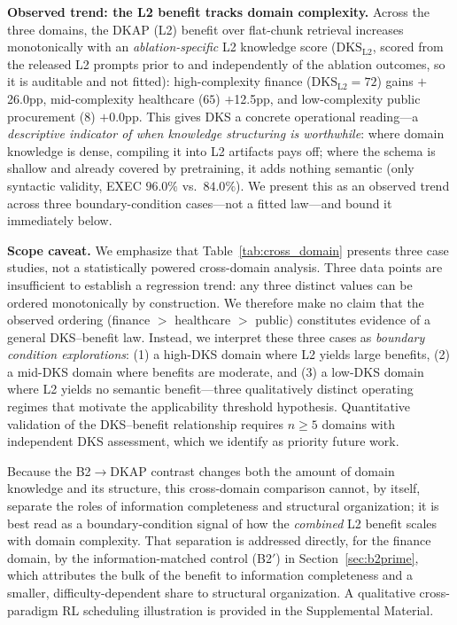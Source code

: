 \documentclass[fleqn,10pt,lineno]{wlpeerj}
\begin{document}
\textbf{Observed trend: the L2 benefit tracks domain complexity.} Across the three domains, the DKAP (L2) benefit over flat-chunk retrieval increases monotonically with an \textit{ablation-specific} L2 knowledge score ($\mathrm{DKS}_{\mathrm{L2}}$, scored from the released L2 prompts prior to and independently of the ablation outcomes, so it is auditable and not fitted): high-complexity finance ($\mathrm{DKS}_{\mathrm{L2}}{=}72$) gains $+$26.0pp, mid-complexity healthcare ($65$) $+$12.5pp, and low-complexity public procurement ($8$) $+$0.0pp. This gives DKS a concrete operational reading---a \textit{descriptive indicator of when knowledge structuring is worthwhile}: where domain knowledge is dense, compiling it into L2 artifacts pays off; where the schema is shallow and already covered by pretraining, it adds nothing semantic (only syntactic validity, EXEC $96.0\%$ vs.\ $84.0\%$). We present this as an observed trend across three boundary-condition cases---not a fitted law---and bound it immediately below.

\textbf{Scope caveat.} We emphasize that Table~\ref{tab:cross_domain} presents three case studies, not a statistically powered cross-domain analysis. Three data points are insufficient to establish a regression trend: any three distinct values can be ordered monotonically by construction. We therefore make no claim that the observed ordering (finance $>$ healthcare $>$ public) constitutes evidence of a general DKS--benefit law. Instead, we interpret these three cases as \textit{boundary condition explorations}: (1) a high-DKS domain where L2 yields large benefits, (2) a mid-DKS domain where benefits are moderate, and (3) a low-DKS domain where L2 yields no semantic benefit---three qualitatively distinct operating regimes that motivate the applicability threshold hypothesis. Quantitative validation of the DKS--benefit relationship requires $n \geq 5$ domains with independent DKS assessment, which we identify as priority future work.

Because the B2$\to$DKAP contrast changes both the amount of domain knowledge and its structure, this cross-domain comparison cannot, by itself, separate the roles of information completeness and structural organization; it is best read as a boundary-condition signal of how the \textit{combined} L2 benefit scales with domain complexity. That separation is addressed directly, for the finance domain, by the information-matched control (B2$'$) in Section~\ref{sec:b2prime}, which attributes the bulk of the benefit to information completeness and a smaller, difficulty-dependent share to structural organization. A qualitative cross-paradigm RL scheduling illustration is provided in the Supplemental Material.
\end{document}
